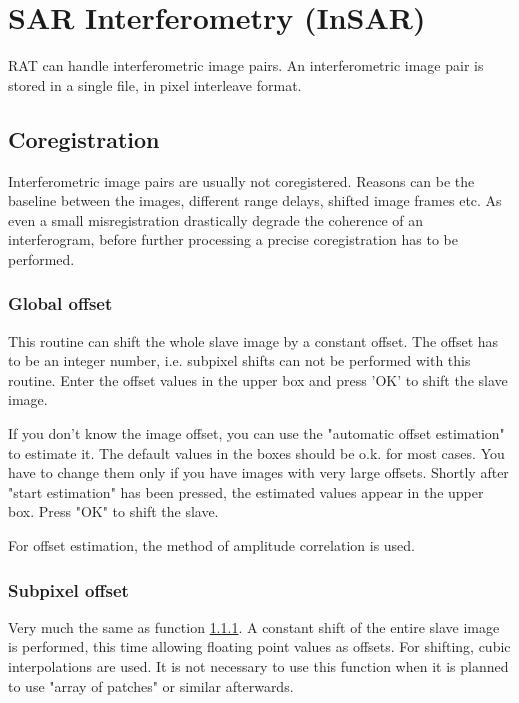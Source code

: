 \chapter{SAR Interferometry (InSAR)}
RAT can handle interferometric image pairs. An interferometric image
pair is stored in a single file, in pixel interleave format. 

\section{Coregistration}
Interferometric image pairs are usually not coregistered. Reasons
can be the baseline between the images, different range delays, shifted
image frames etc. As even a small misregistration drastically degrade the
coherence of an interferogram, before further processing a precise
coregistration has to be performed.

\subsection{Global offset}\label{sec:insar_goff}
This routine can shift the whole slave image by a constant offset.
The offset has to be an integer number, i.e. subpixel shifts
can not be performed with this routine. Enter the offset values in 
the upper box and press 'OK' to shift the slave image. 

If you don't know the image offset, you can use the "automatic offset
estimation" to estimate it. The default values in the boxes should be
o.k. for most cases. You have to change them only if you have images
with very large offsets. Shortly after "start estimation" has been pressed,
the estimated values appear in the upper box. Press "OK" to shift
the slave.

For offset estimation, the method of amplitude correlation is used. 
\subsection{Subpixel offset}\label{sec:insar_soff}
Very much the same as function \ref{sec:insar_goff}. A constant shift
of the entire slave image is performed, this time allowing floating point
values as offsets. For shifting, cubic interpolations are used.
It is not necessary to use this function when it is planned to use
"array of patches" or similar afterwards.


